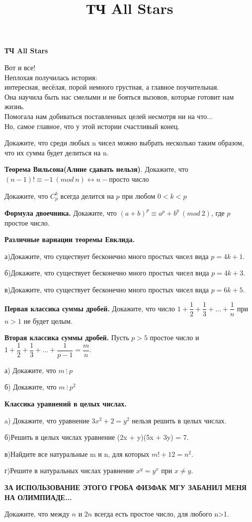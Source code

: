 \centerline{\bf \Huge  ТЧ All Stars}
\title{ТЧ All Stars}

\begin{flushright}
    \scriptsize Вот и все!\\ Неплохая получилась история: \\интересная, весёлая, порой немного грустная, а главное поучительная. \\Она научила быть нас смелыми и не бояться вызовов, которые готовит нам жизнь. \\Помогала нам добиваться поставленных целей несмотря ни на что... \\Но, самое главное, что у этой истории счастливый конец.
\end{flushright}

Докажите, что среди любых n чисел можно выбрать несколько таким образом, что их сумма будет делиться на n.

\textbf{Теорема Вильсона(Алине сдавать нельзя)}. Докажите, что $(n-1)! \equiv -1 \ (mod \ n) \longleftrightarrow n - \text{просто число}$

 Докажите, что $C_p^k$ всегда делится на $p$ при любом $0<k<p$

\textbf{Формула двоечника.} Докажите, что $(a+b)^p \equiv a^p + b^p \ (mod \ 2)$, где $p$ простое число.

\textbf{Различные вариации теоремы Евклида.}

а)Докажите, что существует бесконечно много простых чисел вида  $p = 4k + 1.$

б)Докажите, что существует бесконечно много простых чисел вида  $p = 4k + 3.$

в)Докажите, что существует бесконечно много простых чисел вида  $p = 6k + 5.$

\textbf{Первая классика суммы дробей.} Докажите, что число $1 + \dfrac{1}{2} + \dfrac{1}{3} + \dotsc+ \dfrac{1}{n}$  при  $n > 1$  не будет целым.

\textbf{Вторая классика суммы дробей.} Пусть $p>5$ простое число и $1+\dfrac{1}{2}+\dfrac{1}{3}+\dotsc+\dfrac{1}{p-1}=\dfrac{m}{n}.$

а) Докажите, что $m \ \vdots \ p$

б) Докажите, что $m \ \vdots \ p^2$

\textbf{Классика уравнений в целых числах.}

a) Докажите, что уравнение  $3x^2 + 2 = y^2$  нельзя решить в целых числах.

б)Решить в целых числах уравнение  (2x + y)(5x + 3y) = 7.

в)Найдите все натуральные m и n, для которых  $m! + 12 = n^2$.

г)Решите в натуральных числах уравнение  $x^y = y^x$  при  $x \neq y$.

\large{\textbf{ЗА ИСПОЛЬЗОВАНИЕ ЭТОГО ГРОБА ФИЗФАК МГУ ЗАБАНИЛ МЕНЯ НА ОЛИМПИАДЕ...}}

Докажите, что между $n$ и $2n$ всегда есть простое число, для любого n>1.








